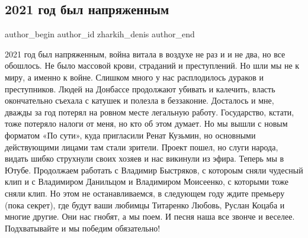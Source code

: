  
 
 
 
 
 
\subsection{2021 год был напряженным}
\label{sec:31_12_2021.fb.zharkih_denis.1.2021_god}
 
\ifcmt
 author_begin
   author_id zharkih_denis
 author_end
\fi


2021 год был напряженным, война витала в воздухе не раз и и не два, но все
обошлось. Не было массовой крови, страданий и преступлений. Но шли мы не к
миру, а именно к войне. Слишком много у нас расплодилось дураков и
преступников. Людей на Донбассе продолжают убивать и калечить, власть
окончательно съехала с катушек и полезла в беззаконие. Досталось и мне, дважды
за год потерял на ровном месте легальную работу. Государство, кстати, тоже
потеряло налоги от меня, но кто об этом думает. Но мы вышли с новым форматом
«По сути», куда пригласили Ренат Кузьмин, но основными действующими лицами там
стали зрители. Проект пошел, но слуги народа, видать шибко струхнули своих
хозяев и нас викинули из эфира. Теперь мы в Ютубе. Продолжаем работать с
Владимир Быстряков, с котороым сняли чудесный клип и с Владимиром Данильцом и
Владимиром Моисеенко, с которыми тоже сняли клип. Но этом не останавливаемся, в
следующем году ждите премьеру (пока секрет), где будут ваши любимцы Титаренко
Любовь, Руслан Коцаба и многие другие. Они нас гнобят, а мы поем. И песня наша
все звонче и веселее. Подхватывайте и мы победим обязательно!

